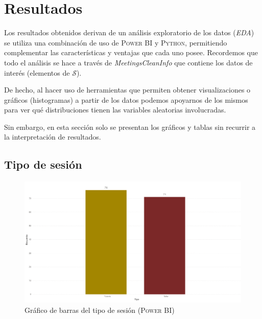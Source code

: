 \documentclass[11pt,a4paper]{book}
\theoremstyle{definition}%
\begin{document}
        \chapter{Resultados}
            Los resultados obtenidos derivan de un análisis exploratorio de los datos (\textit{EDA}) se utiliza una combinación de uso de \textsc{Power BI} y \textsc{Python}, permitiendo complementar las características y ventajas que cada uno posee. Recordemos que todo el análisis se hace a través de \textit{MeetingsCleanInfo} que contiene los datos de interés (elementos de $\mathcal{S}$).
            
            De hecho, al hacer uso de herramientas que permiten obtener visualizaciones o gráficos (histogramas) a partir de los datos podemos apoyarnos de los mismos para ver qué distribuciones tienen las variables aleatorias involucradas.
            
            Sin embargo, en esta sección solo se presentan los gráficos y tablas sin recurrir a la interpretación de resultados.
            \newpage
            \section{Tipo de sesión}
                
                \begin{figure}[H]
                    \centering
                    \includegraphics[width=1\textwidth]{Sources/histograma_TipoGlobal.png}
                    \caption{Gráfico de barras del tipo de sesión (\textsc{Power BI})}
                    \label{fig:histograma_TipoGlobal}
                \end{figure}
                
\end{document}

